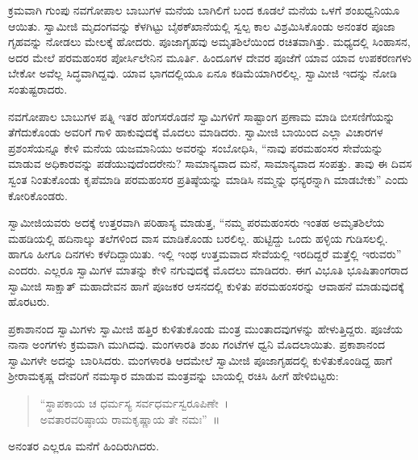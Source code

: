  ಕ್ರಮವಾಗಿ ಗುಂಪು ನವಗೋಪಾಲ ಬಾಬುಗಳ ಮನೆಯ ಬಾಗಿಲಿಗೆ ಬಂದ ಕೂಡಲೆ ಮನೆಯ ಒಳಗೆ ಶಂಖಧ್ವನಿಯೂ ಆಯಿತು. ಸ್ವಾಮೀಜಿ ಮೃದಂಗವನ್ನು ಕೆಳಗಿಟ್ಟು ಬೈಠಕ್‍ಖಾನೆ\-ಯಲ್ಲಿ ಸ್ವಲ್ಪ ಕಾಲ ವಿಶ್ರಮಿಸಿಕೊಂಡು ಅನಂತರ ಪೂಜಾ ಗೃಹವನ್ನು ನೋಡಲು ಮೇಲಕ್ಕೆ ಹೋದರು. ಪೂಜಾಗೃಹವು ಅಮೃತಶಿಲೆಯಿಂದ ರಚಿತವಾಗಿತ್ತು. ಮಧ್ಯದಲ್ಲಿ ಸಿಂಹಾಸನ, ಅದರ ಮೇಲೆ ಪರಮಹಂಸರ ಪೋರ್ಸಿ‍‍ಲೇನಿನ ಮೂರ್ತಿ. ಹಿಂದೂಗಳ ದೇವರ ಪೂಜೆಗೆ ಯಾವ ಯಾವ ಉಪಕರಣಗಳು ಬೇಕೋ ಅವೆಲ್ಲ ಸಿದ್ಧವಾಗಿದ್ದವು. ಯಾವ ಭಾಗದಲ್ಲಿಯೂ ಏನೂ ಕಡಿಮೆಯಾಗಿರಲಿಲ್ಲ. ಸ್ವಾಮೀಜಿ ಇದನ್ನು ನೋಡಿ ಸಂತುಷ್ಟರಾದರು. 

 ನವಗೋಪಾಲ ಬಾಬುಗಳ ಪತ್ನಿ ಇತರ ಹೆಂಗಸರೊಡನೆ ಸ್ವಾಮಿಗಳಿಗೆ ಸಾಷ್ಟಾಂಗ ಪ್ರಣಾಮ ಮಾಡಿ ಬೀಸಣಿಗೆಯನ್ನು ತೆಗೆದುಕೊಂಡು ಅವರಿಗೆ ಗಾಳಿ ಹಾಕುವುದಕ್ಕೆ ಮೊದಲು ಮಾಡಿದರು. ಸ್ವಾಮೀಜಿ ಬಾಯಿಂದ ಎಲ್ಲಾ ವಿಚಾರಗಳ ಪ್ರಶಂಸೆಯನ್ನೂ ಕೇಳಿ ಮನೆಯ ಯಜಮಾನಿಯು ಅವರನ್ನು ಸಂಬೋಧಿಸಿ, “ನಾವು ಪರಮಹಂಸರ ಸೇವೆಯನ್ನು ಮಾಡುವ ಅಧಿಕಾರವನ್ನು ಪಡೆಯುವುದೆಂದರೇನು? ಸಾಮಾನ್ಯವಾದ ಮನೆ, ಸಾಮಾನ್ಯವಾದ ಸಂಪತ್ತು. ತಾವು ಈ ದಿವಸ ಸ್ವಂತ ನಿಂತುಕೊಂಡು ಕೃಪೆಮಾಡಿ ಪರಮಹಂಸರ ಪ್ರತಿಷ್ಠೆಯನ್ನು ಮಾಡಿಸಿ ನಮ್ಮನ್ನು ಧನ್ಯರನ್ನಾಗಿ ಮಾಡಬೇಕು” ಎಂದು ಕೋರಿಕೊಂಡರು. 

 ಸ್ವಾಮೀಜಿಯವರು ಅದಕ್ಕೆ ಉತ್ತರವಾಗಿ ಪರಿಹಾಸ್ಯ ಮಾಡುತ್ತ, “ನಮ್ಮ ಪರಮಹಂಸರು ಇಂತಹ ಅಮೃತಶಿಲೆಯ ಮಹಡಿಯಲ್ಲಿ ಹದಿನಾಲ್ಕು ತಲೆಗಳಿಂದ ವಾಸ ಮಾಡಿಕೊಂಡು ಬರಲಿಲ್ಲ. ಹುಟ್ಟಿದ್ದು ಒಂದು ಹಳ್ಳಿಯ ಗುಡಿಸಲಲ್ಲಿ. ಹಾಗೂ ಹೀಗೂ ದಿನಗಳು ಕಳೆದಿದ್ದಾಯಿತು. ಇಲ್ಲಿ ಇಂಥ ಉತ್ತಮವಾದ ಸೇವೆಯಲ್ಲಿ ಇರದಿದ್ದರೆ ಮತ್ತೆಲ್ಲಿ ಇರುವರು” ಎಂದರು. ಎಲ್ಲರೂ ಸ್ವಾಮಿಗಳ ಮಾತನ್ನು ಕೇಳಿ ನಗುವುದಕ್ಕೆ ಮೊದಲು ಮಾಡಿದರು. ಈಗ ವಿಭೂತಿ ಭೂಷಿತಾಂಗರಾದ ಸ್ವಾಮೀಜಿ ಸಾಕ್ಷಾತ್ ಮಹಾದೇವನ ಹಾಗೆ ಪೂಜಕರ ಆಸನದಲ್ಲಿ ಕುಳಿತು ಪರಮಹಂಸರನ್ನು ಆವಾಹನೆ ಮಾಡುವುದಕ್ಕೆ ಹೊರಟರು. 

 ಪ್ರಕಾಶಾನಂದ ಸ್ವಾಮಿಗಳು ಸ್ವಾಮೀಜಿ ಹತ್ತಿರ ಕುಳಿತುಕೊಂಡು ಮಂತ್ರ ಮುಂತಾದವುಗಳನ್ನು ಹೇಳುತ್ತಿದ್ದರು. ಪೂಜೆಯ ನಾನಾ ಅಂಗಗಳು ಕ್ರಮವಾಗಿ ಮುಗಿದವು. ಮಂಗಳಾರತಿ ಶಂಖ ಗಂಟೆಗಳ ಧ್ವನಿ ಮೊದಲಾಯಿತು. ಪ್ರಕಾಶಾನಂದ ಸ್ವಾಮಿಗಳೇ ಅದನ್ನು ಬಾರಿಸಿದರು. ಮಂಗಳಾರತಿ ಆದಮೇಲೆ ಸ್ವಾಮೀಜಿ ಪೂಜಾಗೃಹದಲ್ಲಿ ಕುಳಿತುಕೊಂಡಿದ್ದ ಹಾಗೆ ಶ‍್ರೀರಾಮಕೃಷ್ಣ ದೇವರಿಗೆ ನಮಸ್ಕಾರ ಮಾಡುವ ಮಂತ್ರವನ್ನು ಬಾಯಲ್ಲಿ ರಚಿಸಿ ಹೀಗೆ ಹೇಳಿಬಿಟ್ಟರು:

\begin{verse}
“ಸ್ಥಾಪಕಾಯ ಚ ಧರ್ಮಸ್ಯ ಸರ್ವಧರ್ಮಸ್ವರೂಪಿಣೇ~। \\ಅವತಾರವರಿಷ್ಠಾಯ ರಾಮಕೃಷ್ಣಾಯ ತೇ ನಮಃ”~॥ 
\end{verse}

 ಅನಂತರ ಎಲ್ಲರೂ ಮನೆಗೆ ಹಿಂದಿರುಗಿದರು. 

